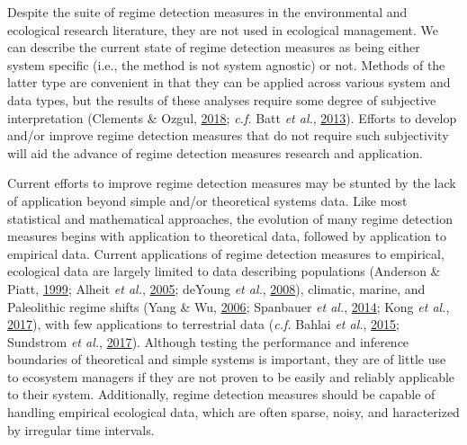 \documentclass[print]{nuthesis}
\begin{document}
Despite the suite of regime detection measures in the environmental and ecological research literature, they are not used in ecological management. We can describe the current state of regime detection measures as being either system specific (i.e., the method is not system agnostic) or not. Methods of the latter type are convenient in that they can be applied across various system and data types, but the results of these analyses require some degree of subjective interpretation (Clements \& Ozgul, \protect\hyperlink{ref-clements2018indicators}{2018}; \emph{c.f.} Batt \emph{et al.}, \protect\hyperlink{ref-batt2013changes}{2013}). Efforts to develop and/or improve regime detection measures that do not require such subjectivity will aid the advance of regime detection measures research and application.

Current efforts to improve regime detection measures may be stunted by the lack of application beyond simple and/or theoretical systems data. Like most statistical and mathematical approaches, the evolution of many regime detection measures begins with application to theoretical data, followed by application to empirical data. Current applications of regime detection measures to empirical, ecological data are largely limited to data describing populations (Anderson \& Piatt, \protect\hyperlink{ref-anderson_community_1999}{1999}; Alheit \emph{et al.}, \protect\hyperlink{ref-alheit_synchronous_2005}{2005}; deYoung \emph{et al.}, \protect\hyperlink{ref-deyoung_regime_2008}{2008}), climatic, marine, and Paleolithic regime shifts (Yang \& Wu, \protect\hyperlink{ref-yang_10_2006}{2006}; Spanbauer \emph{et al.}, \protect\hyperlink{ref-spanbauer_prolonged_2014}{2014}; Kong \emph{et al.}, \protect\hyperlink{ref-kong2017hydrological}{2017}), with few applications to terrestrial data (\emph{c.f.} Bahlai \emph{et al.}, \protect\hyperlink{ref-bahlai2015shifts}{2015}; Sundstrom \emph{et al.}, \protect\hyperlink{ref-sundstrom2017detecting}{2017}). Although testing the performance and inference boundaries of theoretical and simple systems is important, they are of little use to ecosystem managers if they are not proven to be easily and reliably applicable to their system. Additionally, regime detection measures should be capable of handling empirical ecological data, which are often sparse, noisy, and haracterized by irregular time intervals.
\end{document}
